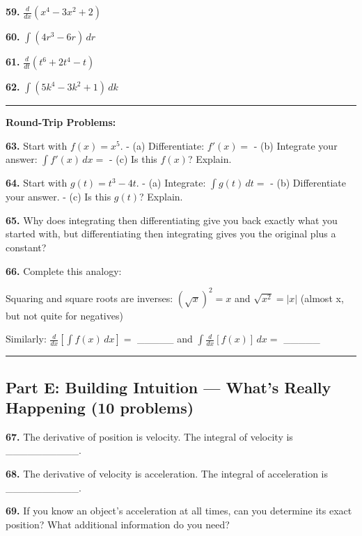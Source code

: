 \documentclass[
  11pt,
]{article}
\begin{document}
\textbf{59.} \(\frac{d}{dx}(x^4 - 3x^2 + 2)\)

\textbf{60.} \(\int (4r^3 - 6r) \, dr\)

\textbf{61.} \(\frac{d}{dt}(t^6 + 2t^4 - t)\)

\textbf{62.} \(\int (5k^4 - 3k^2 + 1) \, dk\)

\begin{center}\rule{0.5\linewidth}{0.5pt}\end{center}

\textbf{Round-Trip Problems:}

\textbf{63.} Start with \(f(x) = x^5\). - (a) Differentiate:
\(f'(x) ={}\) - (b) Integrate your answer: \(\int f'(x) \, dx ={}\) -
(c) Is this \(f(x)\)? Explain.

\textbf{64.} Start with \(g(t) = t^3 - 4t\). - (a) Integrate:
\(\int g(t) \, dt ={}\) - (b) Differentiate your answer. - (c) Is this
\(g(t)\)? Explain.

\textbf{65.} Why does integrating then differentiating give you back
exactly what you started with, but differentiating then integrating
gives you the original plus a constant?

\textbf{66.} Complete this analogy:

Squaring and square roots are inverses: \((\sqrt{x})^2 = x\) and
\(\sqrt{x^2} = |x|\) (almost x, but not quite for negatives)

Similarly: \(\frac{d}{dx}\left[\int f(x) \, dx\right] ={}\) \_\_\_\_\_
and \(\int \frac{d}{dx}[f(x)] \, dx ={}\) \_\_\_\_\_

\begin{center}\rule{0.5\linewidth}{0.5pt}\end{center}

\hypertarget{part-e-building-intuition-whats-really-happening-10-problems}{%
\subsection{Part E: Building Intuition --- What's Really Happening (10
problems)}\label{part-e-building-intuition-whats-really-happening-10-problems}}

\textbf{67.} The derivative of position is velocity. The integral of
velocity is \_\_\_\_\_\_\_\_\_\_.

\textbf{68.} The derivative of velocity is acceleration. The integral of
acceleration is \_\_\_\_\_\_\_\_\_\_.

\textbf{69.} If you know an object's acceleration at all times, can you
determine its exact position? What additional information do you need?
\end{document}
